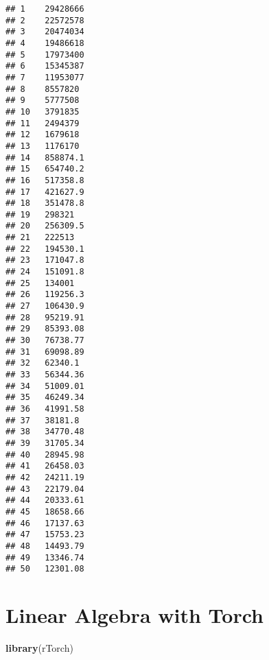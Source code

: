\documentclass[]{book}
\newenvironment{Shaded}{\begin{snugshade}}{\end{snugshade}}
\newcommand{\CommentTok}[1]{\textcolor[rgb]{0.56,0.35,0.01}{\textit{#1}}}
\newcommand{\FloatTok}[1]{\textcolor[rgb]{0.00,0.00,0.81}{#1}}
\newcommand{\KeywordTok}[1]{\textcolor[rgb]{0.13,0.29,0.53}{\textbf{#1}}}
\newcommand{\NormalTok}[1]{#1}
\newcommand{\OperatorTok}[1]{\textcolor[rgb]{0.81,0.36,0.00}{\textbf{#1}}}
\newcommand{\StringTok}[1]{\textcolor[rgb]{0.31,0.60,0.02}{#1}}
\begin{document}
\begin{Shaded}
\end{Shaded}

\begin{verbatim}
## 1    29428666 
## 2    22572578 
## 3    20474034 
## 4    19486618 
## 5    17973400 
## 6    15345387 
## 7    11953077 
## 8    8557820 
## 9    5777508 
## 10   3791835 
## 11   2494379 
## 12   1679618 
## 13   1176170 
## 14   858874.1 
## 15   654740.2 
## 16   517358.8 
## 17   421627.9 
## 18   351478.8 
## 19   298321 
## 20   256309.5 
## 21   222513 
## 22   194530.1 
## 23   171047.8 
## 24   151091.8 
## 25   134001 
## 26   119256.3 
## 27   106430.9 
## 28   95219.91 
## 29   85393.08 
## 30   76738.77 
## 31   69098.89 
## 32   62340.1 
## 33   56344.36 
## 34   51009.01 
## 35   46249.34 
## 36   41991.58 
## 37   38181.8 
## 38   34770.48 
## 39   31705.34 
## 40   28945.98 
## 41   26458.03 
## 42   24211.19 
## 43   22179.04 
## 44   20333.61 
## 45   18658.66 
## 46   17137.63 
## 47   15753.23 
## 48   14493.79 
## 49   13346.74 
## 50   12301.08
\end{verbatim}

\hypertarget{linear_algebra}{%
\chapter{Linear Algebra with Torch}\label{linear_algebra}}

\begin{Shaded}
\begin{Highlighting}[]
\KeywordTok{library}\NormalTok{(rTorch)}
\end{Highlighting}
\end{Shaded}
\end{document}

